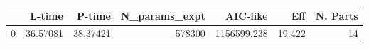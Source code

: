 \begin{tabular}{lrrrrrr}
\toprule
{} &    L-time &    P-time &  N\_params\_expt &     AIC-like &     Eff &  N. Parts \\
\midrule
0 &  36.57081 &  38.37421 &         578300 &  1156599.238 &  19.422 &        14 \\
\bottomrule
\end{tabular}
